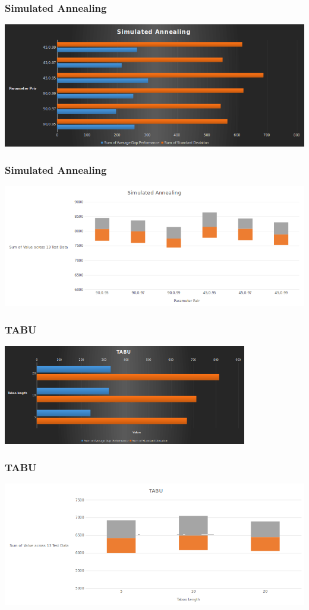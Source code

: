 \documentclass{beamer}
\begin{document}
\begin{frame}
\frametitle{Simulated Annealing}
 \centerline{\includegraphics[width=1.0\textwidth]{simulated_annealing.png}}
\end{frame}
\begin{frame}
\frametitle{Simulated Annealing}
 \centerline{\includegraphics[width=1.0\textwidth]{simulated_annealing2.png}}
\end{frame}
\begin{frame}
\frametitle{TABU}
 \centerline{\includegraphics[width=0.8\textwidth]{TABU.png}}
\end{frame}
\begin{frame}
\frametitle{TABU}
 \centerline{\includegraphics[width=1.0\textwidth]{TABU2.png}}
\end{frame}
\end{document}
